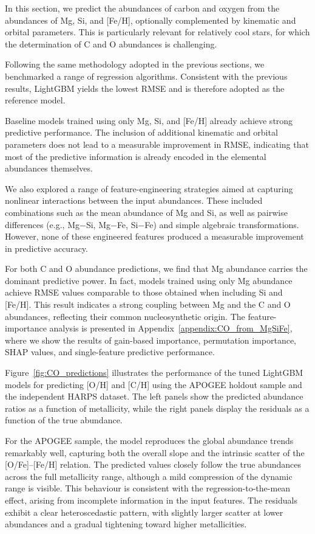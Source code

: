 \documentclass{aa}
\begin{document}
In this section, we predict the abundances of carbon and oxygen from the abundances of Mg, Si, and [Fe/H], optionally complemented by kinematic and orbital parameters. This is particularly relevant for relatively cool stars, for which the determination of C and O abundances is challenging.

Following the same methodology adopted in the previous sections, we benchmarked a range of regression algorithms. Consistent with the previous results, LightGBM yields the lowest RMSE and is therefore adopted as the reference model.

Baseline models trained using only Mg, Si, and [Fe/H] already achieve strong predictive performance. The inclusion of additional kinematic and orbital parameters does not lead to a measurable improvement in RMSE, indicating that most of the predictive information is already encoded in the elemental abundances themselves.

We also explored a range of feature-engineering strategies aimed at capturing nonlinear interactions between the input abundances. These included combinations such as the mean abundance of Mg and Si, as well as pairwise differences (e.g., Mg$-$Si, Mg$-$Fe, Si$-$Fe) and simple algebraic transformations. However, none of these engineered features produced a measurable improvement in predictive accuracy.

For both C and O abundance predictions, we find that Mg abundance carries the dominant predictive power. In fact, models trained using only Mg abundance achieve RMSE values comparable to those obtained when including Si and [Fe/H]. This result indicates a strong coupling between Mg and the C and O abundances, reflecting their common nucleosynthetic origin. The feature-importance analysis is presented in Appendix~\ref{appendix:CO_from_MgSiFe}, where we show the results of gain-based importance, permutation importance, SHAP values, and single-feature predictive performance.

Figure~\ref{fig:CO_predictions} illustrates the performance of the tuned LightGBM models for predicting [O/H] and [C/H] using the APOGEE holdout sample and the independent HARPS dataset. The left panels show the predicted abundance ratios as a function of metallicity, while the right panels display the residuals as a function of the true abundance.

For the APOGEE sample, the model reproduces the global abundance trends remarkably well, capturing both the overall slope and the intrinsic scatter of the [O/Fe]--[Fe/H] relation. The predicted values closely follow the true abundances across the full metallicity range, although a mild compression of the dynamic range is visible. This behaviour is consistent with the regression-to-the-mean effect, arising from incomplete information in the input features. The residuals exhibit a clear heteroscedastic pattern, with slightly larger scatter at lower abundances and a gradual tightening toward higher metallicities.
\end{document}
